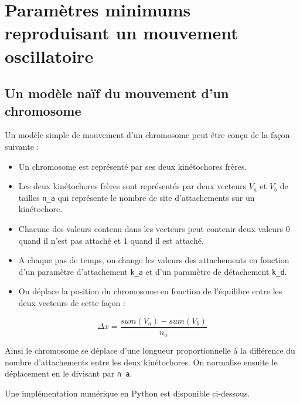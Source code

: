 \documentclass[12pt,a4paper,twoside,openright]{book}
\begin{document}
\cleardoublepage
\clearpage\null

\section{Paramètres minimums reproduisant un mouvement
oscillatoire}\label{paramuxe8tres-minimums-reproduisant-un-mouvement-oscillatoire}

\label{sec:simu-oscillations}

\subsection{Un modèle naïf du mouvement d'un
chromosome}\label{un-moduxe8le-nauxeff-du-mouvement-dun-chromosome}

Un modèle simple de mouvement d'un chromosome peut être conçu de la
façon suivante :

\begin{itemize}
\item
  Un chromosome est représenté par ses deux kinétochores frères.
\item
  Les deux kinétochores frères sont représentés par deux vecteurs
  \(V_a\) et \(V_b\) de tailles \texttt{n\_a} qui représente le nombre
  de site d'attachements sur un kinétochore.
\item
  Chacune des valeurs contenu dans les vecteurs peut contenir deux
  valeurs \(0\) quand il n'est pas attaché et \(1\) quand il est
  attaché.
\item
  A chaque pas de temps, on change les valeurs des attachements en
  fonction d'un paramètre d'attachement \texttt{k\_a} et d'un paramètre
  de détachement \texttt{k\_d}.
\item
  On déplace la position du chromosome en fonction de l'équilibre entre
  les deux vecteurs de cette façon :
\end{itemize}

\[
\Delta x = \frac{sum(V_a) - sum(V_b)}{n_a}
\]

Ainsi le chromosome se déplace d'une longueur proportionnelle à la
différence du nombre d'attachements entre les deux kinétochores. On
normalise ensuite le déplacement en le divisant par \texttt{n\_a}.

Une implémentation numérique en Python est disponible ci-dessous.
\end{document}
